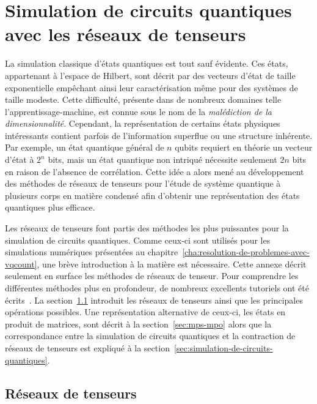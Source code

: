 \chapter{Simulation de circuits quantiques avec les réseaux de tenseurs}
\label{ann:simulation-circuits-quantiques-avec-reseaux-de-tenseurs}

La simulation classique d'états quantiques est tout sauf évidente. Ces états, appartenant à l'espace de Hilbert, sont décrit par des vecteurs d'état de taille exponentielle empêchant ainsi leur caractérisation même pour des systèmes de taille modeste. Cette difficulté, présente dans de nombreux domaines telle l'apprentissage-machine, est connue sous le nom de la \textit{malédiction de la dimensionnalité}. Cependant, la représentation de certains états physiques intéressants contient parfois de l'information superflue ou une structure inhérente. Par exemple, un état quantique général de $n$ qubits requiert en théorie un vecteur d'état à $2^{n}$ bits, mais un état quantique non intriqué nécessite seulement $2n$ bits en raison de l'absence de corrélation. Cette idée a alors mené au développement des méthodes de réseaux de tenseurs pour l'étude de système quantique à plusieurs corps en matière condensé afin d'obtenir une représentation des états quantiques plus efficace.

Les réseaux de tenseurs font partis des méthodes les plus puissantes pour la simulation de circuits quantiques. Comme ceux-ci sont utilisés pour les simulations numériques présentées au chapitre~\ref{cha:resolution-de-problemes-avec-vqcount}, une brève introduction à la matière est nécessaire. Cette annexe décrit seulement en surface les méthodes de réseaux de tenseur. Pour comprendre les différentes méthodes plus en profondeur, de nombreux excellents tutoriels ont été écrits~\cite{bridgemanHandwavingInterpretiveDance2017,biamonteTensorNetworksNutshell2017,bakerMethodesCalculAvec2021}. La section~\ref{sec:reseaux-de-tenseurs} introduit les réseaux de tenseurs ainsi que les principales opérations possibles. Une représentation alternative de ceux-ci, les états en produit de matrices, sont décrit à la section~\ref{sec:mps-mpo} alors que la correspondance entre la simulation de circuits quantiques et la contraction de réseaux de tenseurs est expliqué à la section~\ref{sec:simulation-de-circuits-quantiques}.


\section{Réseaux de tenseurs}
\label{sec:reseaux-de-tenseurs}

